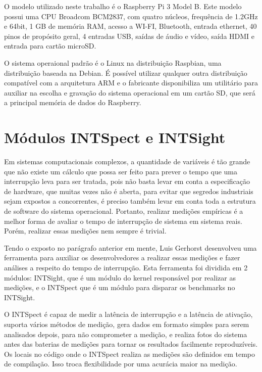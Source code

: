 O modelo utilizado neste trabalho é o Raspberry Pi 3 Model B. Este modelo possui uma CPU Broadcom BCM2837, com quatro núcleos, frequência de 1.2GHz e 64bit, 1 GB de memória RAM, acesso a WI-FI, Bluetooth, entrada ethernet, 40 pinos de propósito geral, 4 entradas USB, saídas de áudio e vídeo, saída HDMI e entrada para cartão microSD.

O sistema operaional padrão é o Linux na distribuição Raspbian, uma distribuição baseada na Debian. É possível utilizar qualquer outra distribuição compatível com a arquitetura ARM e o fabricante disponibiliza um utilitário para auxiliar na escolha e gravação do sistema operacional em um cartão SD, que será a principal memória de dados do Raspberry.

\section{Módulos INTSpect e INTSight}

Em sistemas computacionais complexos, a quantidade de variáveis é tão grande que não existe um cálculo que possa ser feito para prever o tempo que uma interrupção leva para ser tratada, pois não basta levar em conta a especificação de hardware, que muitas vezes não é aberta, para evitar que segredos industriais sejam expostos a concorrentes, é preciso também levar em conta toda a estrutura de software do sistema operacional. Portanto, realizar medições empíricas é a melhor forma de avaliar o tempo de interrupção de sistema em sistema reais. Porém, realizar essas medições nem sempre é trivial.

Tendo o exposto no parágrafo anterior em mente, Luis Gerhorst \cite{Gerhorst2018} desenvolveu uma ferramenta para auxiliar os desenvolvedores a realizar essas medições e fazer análises a respeito do tempo de interrupção. Esta ferramenta foi dividida em 2 módulos: INTSight, que é um módulo do kernel responsável por realizar as medições, e o INTSpect que é um módulo para disparar os benchmarks no INTSight.

O INTSpect é capaz de medir a latência de interrupção e a latência de ativação, suporta vários métodos de medição, gera dados em formato simples para serem analisados depois, para não comprometer a medição, e realiza fotos do sistema antes das baterias de medições para tornar os resultados facilmente reproduzíveis. Os locais no código onde o INTSpect realiza as medições são definidos em tempo de compilação. Isso troca flexibilidade por uma acurácia maior na medição.

